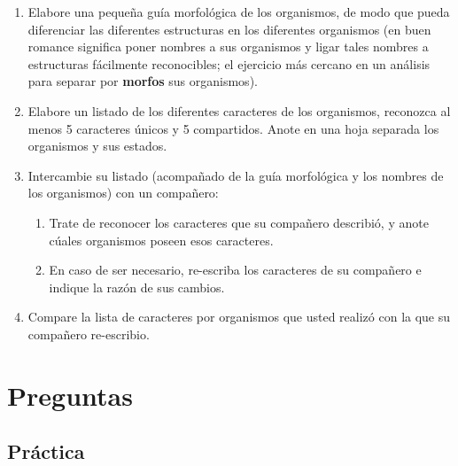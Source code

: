 \begin{enumerate}
	\item Elabore una peque\~na gu\'ia morfol\'ogica de los organismos, de modo que pueda diferenciar las diferentes estructuras en los diferentes organismos (en buen romance significa poner nombres a sus organismos y ligar tales nombres a estructuras f\'acilmente reconocibles; el ejercicio m\'as cercano en un an\'alisis para separar por \textbf{morfos} sus organismos).

	\item Elabore un listado de los diferentes caracteres de los organismos, reconozca al menos 5 caracteres \'unicos y 5 compartidos. Anote en una hoja separada los organismos y sus estados.
	
	\item Intercambie su listado (acompa\~nado de la gu\'ia morfol\'ogica y los nombres de los organismos) con un compa\~nero: 
	
	\begin{enumerate}
		\item Trate de reconocer los caracteres que su compa\~nero describi\'o, y anote c\'uales organismos poseen esos caracteres.
		\item En caso de ser necesario, re-escriba los caracteres de su compa\~nero e indique la raz\'on de sus cambios.
	\end{enumerate}
	
	\item Compare la lista de caracteres por organismos que usted 
	realiz\'o con la que su compa\~nero re-escribio.

\end{enumerate}

\section*{Preguntas}

\subsection*{Pr\'actica}


